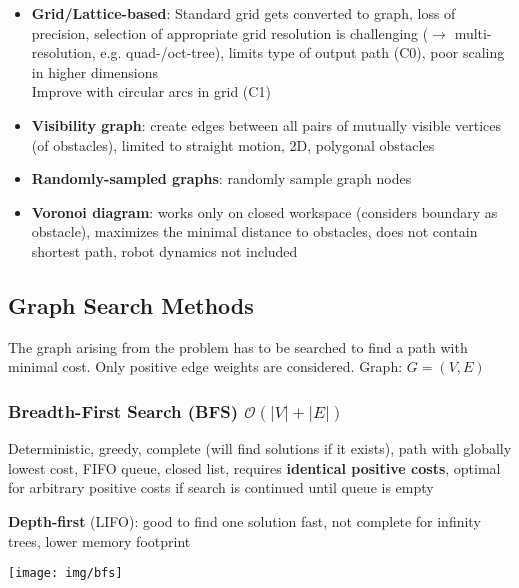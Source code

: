 \documentclass[fontsize=6pt]{scrartcl}
\begin{document}
\begin{multicols*}{4}
\begin{itemize}
	\item \textbf{Grid/Lattice-based}: Standard grid gets converted to graph, loss of precision, selection of appropriate grid resolution is challenging ($\rightarrow$ multi-resolution, e.g. quad-/oct-tree), limits type of output path (C0), poor scaling in higher dimensions\\
	Improve with circular arcs in grid (C1)
	\item \textbf{Visibility graph}: create edges between all pairs of mutually visible vertices (of obstacles), limited to straight motion, 2D, polygonal obstacles
	\item \textbf{Randomly-sampled graphs}: randomly sample graph nodes
	\item \textbf{Voronoi diagram}: works only on closed workspace (considers boundary as obstacle), maximizes the minimal distance to obstacles, does not contain shortest path, robot dynamics not included
\end{itemize}

\subsection*{Graph Search Methods}
The graph arising from the problem has to be searched to find a path with minimal cost. Only positive edge weights are considered. Graph: $G = (V, E)$

\subsubsection*{Breadth-First Search (BFS) $\mathcal{O} (|V| + |E|)$}

\begin{minipage}{0.6\linewidth}
Deterministic, greedy, complete (will find solutions if it exists), path with globally lowest cost, FIFO queue, closed list, requires \textbf{identical positive costs}, optimal for arbitrary positive costs if search is continued until queue is empty

\textbf{Depth-first} (LIFO):
good to find one solution fast, not complete for infinity trees, lower memory footprint

\end{minipage}
\begin{minipage}{0.4\linewidth}
	\texttt{[image: img/bfs]}
\end{minipage}


\end{multicols*}
\end{document}
